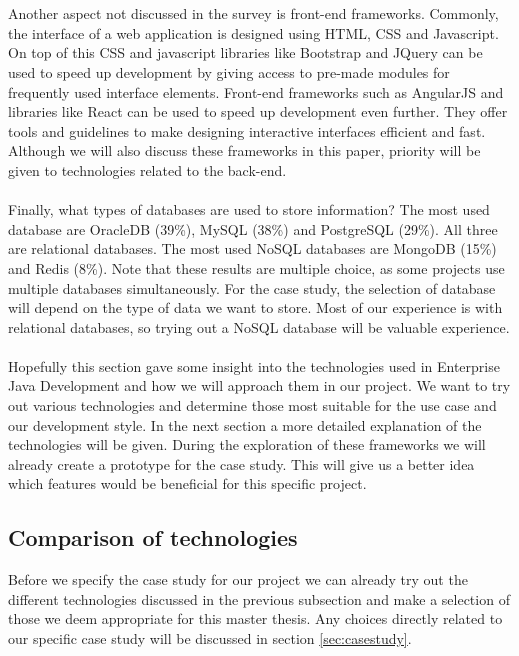 \documentclass[12pt]{article}
\begin{document}
\begin{multicols}{2}
\\\\
Another aspect not discussed in the survey is front-end frameworks. Commonly, the interface of a web application is designed using HTML, CSS and Javascript. On top of this CSS and javascript libraries like Bootstrap and JQuery can be used to speed up development by giving access to pre-made modules for frequently used interface elements. Front-end frameworks such as AngularJS and libraries like React can be used to speed up development even further. They offer tools and guidelines to make designing interactive interfaces efficient and fast. Although we will also discuss these frameworks in this paper, priority will be given to technologies related to the back-end.
\\\\
Finally, what types of databases are used to store information? The most used database are OracleDB (39\%), MySQL (38\%) and PostgreSQL (29\%). All three are relational databases. The most used NoSQL databases are MongoDB (15\%) and Redis (8\%). Note that these results are multiple choice, as some projects use multiple databases simultaneously. For the case study, the selection of database will depend on the type of data we want to store. Most of our experience is with relational databases, so trying out a NoSQL database will be valuable experience.
\\\\
Hopefully this section gave some insight into the technologies used in Enterprise Java Development and how we will approach them in our project. We want to try out various technologies and determine those most suitable for the use case and our development style. In the next section a more detailed explanation of the technologies will be given. During the exploration of these frameworks we will already create a prototype for the case study. This will give us a better idea which features would be beneficial for this specific project.


\subsection{Comparison of technologies}\label{sec:comparison}
Before we specify the case study for our project we can already try out the different technologies discussed in the previous subsection and make a selection of those we deem appropriate for this master thesis. Any choices directly related to our specific case study will be discussed in section \ref{sec:casestudy}.


\end{multicols}
\end{document}
